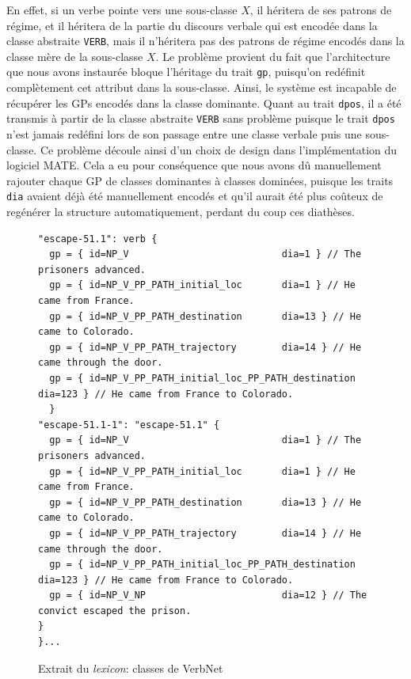 En effet, si un verbe pointe vers une sous-classe $X$, il héritera de ses patrons de régime, et il héritera de la partie du discours verbale qui est encodée dans la classe abstraite \texttt{VERB}, mais il n'héritera pas des patrons de régime encodés dans la classe mère de la sous-classe $X$. Le problème provient du fait que l'architecture que nous avons instaurée bloque l'héritage du trait \texttt{gp}, puisqu'on redéfinit complètement cet attribut dans la sous-classe. Ainsi, le système est incapable de récupérer les \acp{GP} encodés dans la classe dominante. Quant au trait \texttt{dpos}, il a été transmis à partir de la classe abstraite \texttt{VERB} sans problème puisque le trait \texttt{dpos} n'est jamais redéfini lors de son passage entre une classe verbale puis une sous-classe. Ce problème découle ainsi d'un choix de design dans l'implémentation du logiciel MATE. Cela a eu pour conséquence que nous avons dû manuellement rajouter chaque \ac{GP} de classes dominantes à classes dominées, puisque les traits \texttt{dia} avaient déjà été manuellement encodés et qu'il aurait été plus coûteux de regénérer la structure automatiquement, perdant du coup ces diathèses. 

\begin{figure}[htb]
  \caption{Extrait du \emph{lexicon}: classes de VerbNet}
	\label{fig:vnclass}
\begin{lstlisting}[language=mate]
"escape-51.1": verb {
  gp = { id=NP_V                           dia=1 } // The prisoners advanced.
  gp = { id=NP_V_PP_PATH_initial_loc       dia=1 } // He came from France.
  gp = { id=NP_V_PP_PATH_destination       dia=13 } // He came to Colorado.
  gp = { id=NP_V_PP_PATH_trajectory        dia=14 } // He came through the door.
  gp = { id=NP_V_PP_PATH_initial_loc_PP_PATH_destination dia=123 } // He came from France to Colorado.
  }
"escape-51.1-1": "escape-51.1" {
  gp = { id=NP_V                           dia=1 } // The prisoners advanced.
  gp = { id=NP_V_PP_PATH_initial_loc       dia=1 } // He came from France.
  gp = { id=NP_V_PP_PATH_destination       dia=13 } // He came to Colorado.
  gp = { id=NP_V_PP_PATH_trajectory        dia=14 } // He came through the door.
  gp = { id=NP_V_PP_PATH_initial_loc_PP_PATH_destination dia=123 } // He came from France to Colorado.
  gp = { id=NP_V_NP                        dia=12 } // The convict escaped the prison.
}
}...
\end{lstlisting}
\end{figure}

